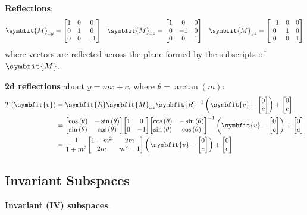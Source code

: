 \documentclass{article}
\begin{document}
\begin{minipage}[t]{126.1962963mm}
    \textbf{Reflections}:
    \begin{align*}
        \symbfit{M}_{xy}=\mqty[1  & 0 & 0 \\ 0 & 1 & 0 \\ 0 & 0 & -1] \quad
        \symbfit{M}_{xz}=\mqty[1  & 0 & 0 \\ 0 & -1 & 0 \\ 0 & 0 & 1] \quad
        \symbfit{M}_{yz}=\mqty[-1 & 0 & 0 \\ 0 & 1 & 0 \\ 0 & 0 & 1]
    \end{align*}
    where vectors are reflected across the plane formed by the subscripts of
    \(\symbfit{M}\).

    \textbf{2d reflections} about \(y=mx + c\), where \(\theta=\arctan{\left( m \right)}\):
    \begin{align*}
        T\left( \symbfit{v} \right) & = \symbfit{R} \symbfit{M}_{xz} \symbfit{R}^{-1} \left( \symbfit{v} - \mqty[0                                \\ c] \right) + \mqty[0 \\ c] \\
                                    & = \mqty[\cos{\left( \theta \right)}                                          & -\sin{\left( \theta \right)} \\ \sin{\left( \theta \right)} & \cos{\left( \theta \right)}] \mqty[1 & 0 \\ 0 & -1] \mqty[\cos{\left( \theta \right)} & -\sin{\left( \theta \right)} \\ \sin{\left( \theta \right)} & \cos{\left( \theta \right)}]^{-1} \left( \symbfit{v} - \mqty[0 \\ c] \right) + \mqty[0 \\ c] \\
                                    & = \frac{1}{1+m^2}\mqty[1-m^2                                                 & 2m                           \\ 2m & m^2-1] \left( \symbfit{v} - \mqty[0 \\ c] \right) + \mqty[0 \\ c] \\
    \end{align*}
    \begin{multicols*}{2}
        \section*{Invariant Subspaces}
        \textbf{Invariant (IV) subspaces}:


\end{multicols*}
\end{minipage}
\end{document}
